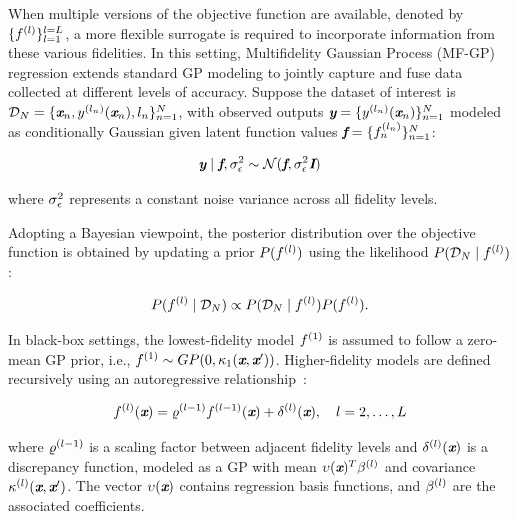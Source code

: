 When multiple versions of the objective function are available, denoted by $\{f^{(l)}\}_{l=1}^{l = L}$, a more flexible surrogate is required to incorporate information from these various fidelities. In this setting, Multifidelity Gaussian Process (MF-GP) regression extends standard GP modeling to jointly capture and fuse data collected at different levels of accuracy. Suppose the dataset of interest is $\mathcal{D}_{N} = \{ \textbf{\em x}_{n}, y^{(l_{n})}(\textbf{\em x}_{n}), l_{n} \}_{n=1}^{N}$, with observed outputs $\textbf{\em y} = \{ y^{(l_{n})}(\textbf{\em x}_{n}) \}_{n=1}^{N}$ modeled as conditionally Gaussian given latent function values $\textbf{\em f} = \{ f^{(l_{n})}_{n} \}_{n=1}^{N}$:

\begin{equation}\label{e:MFGP0}
	\textbf{\em y} \mid \textbf{\em f}, \sigma_{\epsilon}^2 \sim \mathcal{N}(\textbf{\em f}, \sigma_{\epsilon}^2 \textbf{\em I})
\end{equation}

\noindent where $\sigma_{\epsilon}^2$ represents a constant noise variance across all fidelity levels.

Adopting a Bayesian viewpoint, the posterior distribution over the objective function is obtained by updating a prior $P(f^{(l)})$ using the likelihood $P(\mathcal{D}_{N} \mid f^{(l)})$:

\[
	P( f^{(l)} \mid \mathcal{D}_{N}) \propto P(\mathcal{D}_{N} \mid f^{(l)}) P(f^{(l)}).
\]

In black-box settings, the lowest-fidelity model $f^{(1)}$ is assumed to follow a zero-mean GP prior, i.e., $f^{(1)} \sim GP(0, \kappa_1(\textbf{\em x}, \textbf{\em x}'))$. Higher-fidelity models are defined recursively using an autoregressive relationship~\cite{kennedy2000predicting}:

\begin{equation}\label{e:MFGP1}
	f^{(l)}(\textbf{\em x}) = \varrho^{(l-1)} f^{(l - 1)}(\textbf{\em x}) + \delta^{(l)}(\textbf{\em x}), \quad l = 2, \dots, L
\end{equation}

\noindent where $\varrho^{(l-1)}$ is a scaling factor between adjacent fidelity levels and $\delta^{(l)}(\textbf{\em x})$ is a discrepancy function, modeled as a GP with mean $\upsilon(\textbf{\em x})^T \beta^{(l)}$ and covariance $\kappa^{(l)}(\textbf{\em x}, \textbf{\em x}')$. The vector $\upsilon(\textbf{\em x})$ contains regression basis functions, and $\beta^{(l)}$ are the associated coefficients.

